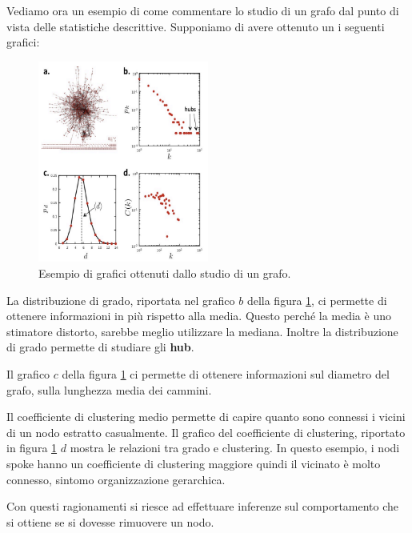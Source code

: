 \begin{esempio}
    Vediamo ora un esempio di come commentare lo studio di un grafo dal punto di
    vista delle statistiche descrittive. Supponiamo di avere ottenuto un
    i seguenti grafici:
    \begin{figure}[!ht]
        \centering
        \includegraphics[width=0.5\textwidth]{./img/net/esempio1.png}
        \caption{Esempio di grafici ottenuti dallo studio di un grafo.}
        \label{fig:graphstats}
    \end{figure}

    La distribuzione di grado, riportata nel grafico $b$ della figura \ref{fig:graphstats},
    ci permette di ottenere informazioni in più rispetto alla media. Questo
    perché la media è uno stimatore distorto, sarebbe meglio utilizzare la
    mediana. Inoltre la distribuzione di grado permette di studiare gli \textbf{hub}.

    Il grafico $c$ della figura \ref{fig:graphstats} ci permette di ottenere
    informazioni sul diametro del grafo, sulla lunghezza media dei cammini.

    Il coefficiente di clustering medio permette di capire quanto sono connessi
    i vicini di un nodo estratto casualmente. Il grafico del coefficiente di
    clustering, riportato in figura \ref{fig:graphstats} $d$ mostra le relazioni
    tra grado e clustering. In questo esempio, i nodi spoke hanno un coefficiente
    di clustering maggiore quindi il vicinato è molto connesso, sintomo
    organizzazione gerarchica.

    Con questi ragionamenti si riesce ad effettuare inferenze sul comportamento
    che si ottiene se si dovesse rimuovere un nodo.
\end{esempio}
